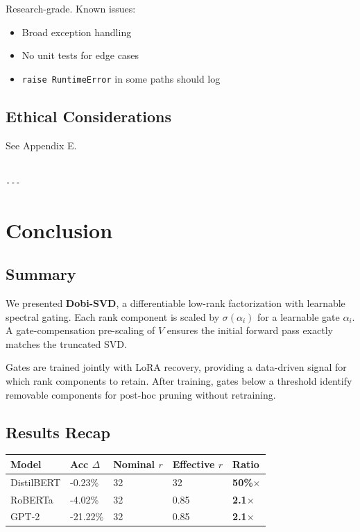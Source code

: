 Research-grade. Known issues:
\begin{itemize}
\item Broad exception handling
\item No unit tests for edge cases
\item \texttt{raise RuntimeError} in some paths should log

\end{itemize}
\subsection{Ethical Considerations}

See Appendix E.
\begin{lstlisting}

---
\end{lstlisting}


\section{Conclusion}

\subsection{Summary}

We presented \textbf{Dobi-SVD}, a differentiable low-rank factorization with 
learnable spectral gating. Each rank component is scaled by $\sigma(\alpha_i)$ 
for a learnable gate $\alpha_i$. A gate-compensation pre-scaling of $V$ 
ensures the initial forward pass exactly matches the truncated SVD.

Gates are trained jointly with LoRA recovery, providing a data-driven 
signal for which rank components to retain. After training, gates below 
a threshold identify removable components for post-hoc pruning without 
retraining.

\subsection{Results Recap}

\begin{table}[H]
\centering
\small
\begin{tabular}{lllll}
\toprule
\textbf{Model} & \textbf{Acc $\Delta$} & \textbf{Nominal $r$} & \textbf{Effective $r$} & \textbf{Ratio} \\
\midrule
DistilBERT & -0.23\% & 32 & 32 & \textbf{50\%$\times$} \\
RoBERTa & -4.02\% & 32 & 0.85 & \textbf{2.1$\times$} \\
GPT-2 & -21.22\% & 32 & 0.85 & \textbf{2.1$\times$} \\
\bottomrule
\end{tabular}
\end{table}

